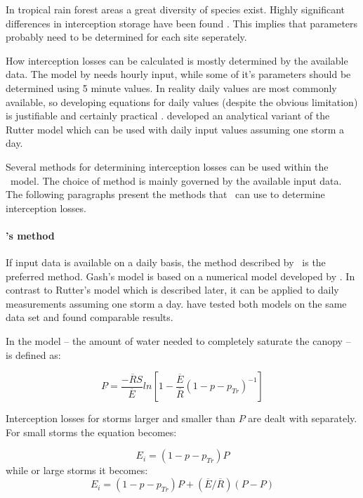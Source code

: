 In tropical rain forest areas a great diversity of species exist. Highly
significant differences in interception storage have been found 
\cite{leonard1967184,herwitz1985181,scatena1990158}. This implies that
parameters probably need to be determined for each site seperately.

How interception losses can be calculated is mostly determined by the
available data. The model by  needs hourly
input, while some of it's parameters should be determined using 5 minute
values. In reality daily values are most commonly available, so
developing equations for daily values (despite the obvious limitation)
is justifiable and certainly practical \cite{jackson1975183}. 
 developed an analytical
variant of the Rutter model which can be used with daily input values
assuming one storm a day.

Several methods for determining interception losses can be used within
the \vamps\ model. The choice of method is mainly governed by the
available input data. The following paragraphs present the methods
that \vamps\ can use to determine interception losses.

\paragraph{'s method}\label{par:gash}
If input data is available on a daily basis, the method described
by~ is the preferred method.  Gash's model is
based on a numerical model developed by . In
contrast to Rutter's model which is described later, it can be applied
to daily measurements assuming one storm a day. 
have tested both models on the same data set and found comparable
results.

In the model   -- the  amount  of water  needed to completely
saturate the canopy \cite{gash1979165} -- is defined as:

\begin{equation}
P\acute{}=\frac{-\overline{R}S}{\overline{E}}
ln\left[1-\frac{\overline{E}}{\overline{R}}
(1-p-p_{Tr})^{-1}\right] 
\end{equation}

Interception losses  for storms larger and  smaller than  $P\acute{}$ are dealt
with separately. For small storms the equation becomes:

\begin{equation}
E_i = (1-p-p_{Tr}) P 
\end{equation}
while or large storms it becomes:
\begin{equation}
E_i = (1-p-p_{Tr}) P\acute{} + (\overline{E}/\overline{R}) (P - P\acute{})
\end{equation}

